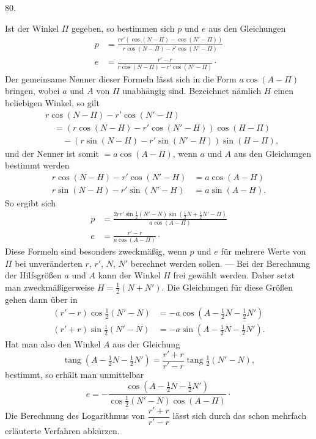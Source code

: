\medskip
\hypertarget{native-109-article080}{}
\begin{center}80.\end{center}
Ist der Winkel $\Pi$ gegeben, so bestimmen sich $p$ und $e$ aus den Gleichungen
\[
\begin{aligned}
p&=\frac{rr'(\cos(N-\Pi)-\cos(N'-\Pi))}{r\cos(N-\Pi)-r'\cos(N'-\Pi)}\\[4pt]
e&=\frac{r'-r}{r\cos(N-\Pi)-r'\cos(N'-\Pi)}\mathpunct{\cdot}
\end{aligned}
\]
Der gemeinsame Nenner dieser Formeln lässt sich in die Form $a\cos(A-\Pi)$ bringen, wobei $a$ und $A$ von $\Pi$ unabhängig sind. Bezeichnet nämlich $H$ einen beliebigen Winkel, so gilt
\[
\begin{aligned}
&r\cos(N-\Pi)-r'\cos(N'-\Pi)\\
&\quad=(r\cos(N-H)-r'\cos(N'-H))\cos(H-\Pi)\\
&\qquad-(r\sin(N-H)-r'\sin(N'-H))\sin(H-\Pi),
\end{aligned}
\]
und der Nenner ist somit $=a\cos(A-\Pi)$, wenn $a$ und $A$ aus den Gleichungen bestimmt werden
\[
\begin{aligned}
r\cos(N-H)-r'\cos(N'-H)&=a\cos(A-H)\\
r\sin(N-H)-r'\sin(N'-H)&=a\sin(A-H).
\end{aligned}
\]
So ergibt sich
\[
\begin{aligned}
p&=\frac{2rr'\sin\tfrac12(N'-N)\sin(\tfrac12N+\tfrac12N'-\Pi)}{a\cos(A-\Pi)}\\[4pt]
e&=\frac{r'-r}{a\cos(A-\Pi)}\mathpunct{\cdot}
\end{aligned}
\]
Diese Formeln sind besonders zweckmäßig, wenn $p$ und $e$ für mehrere Werte von $\Pi$ bei unveränderten $r$, $r'$, $N$, $N'$ berechnet werden sollen. — Bei der Berechnung der Hilfsgrößen $a$ und $A$ kann der Winkel $H$ frei gewählt werden. Daher setzt man zweckmäßigerweise $H=\tfrac12(N+N')$. Die Gleichungen für diese Größen gehen dann über in
\[
\begin{aligned}
(r'-r)\cos\tfrac12(N'-N)&=-a\cos(A-\tfrac12N-\tfrac12N')\\
(r'+r)\sin\tfrac12(N'-N)&=-a\sin(A-\tfrac12N-\tfrac12N').
\end{aligned}
\]
Hat man also den Winkel $A$ aus der Gleichung
\[
\operatorname{tang}(A-\tfrac12N-\tfrac12N')=\frac{r'+r}{r'-r}\operatorname{tang}\tfrac12(N'-N),
\]
bestimmt, so erhält man unmittelbar
\[
e=-\frac{\cos(A-\tfrac12N-\tfrac12N')}{\cos\tfrac12(N'-N)\cos(A-\Pi)}\mathpunct{\cdot}
\]
Die Berechnung des Logarithmus von $\dfrac{r'+r}{r'-r}$ lässt sich durch das schon mehrfach erläuterte Verfahren abkürzen.
